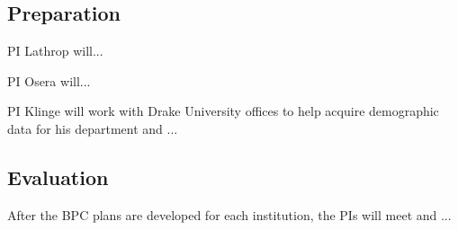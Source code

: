 \documentclass[11pt]{article}
\begin{document}
    \subsection{Preparation}
    PI Lathrop will...

    PI Osera will...

    PI Klinge will work with Drake University offices to help acquire demographic data for his department and ...

    \subsection{Evaluation}
    After the BPC plans are developed for each institution, the PIs will meet and ...



\end{document}
